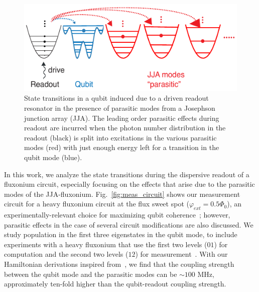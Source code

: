 \documentclass[prx,showpacs,notitlepage,twocolumn,superscriptaddress,nofootinbib,preprintnumbers,floatfix]{revtex4-2}
\begin{document}
\begin{figure}
    \centering
    \includegraphics[width=\linewidth]{Figures/Demo.pdf}
    \caption{State transitions in a qubit induced due to a driven readout resonator in the presence of parasitic modes from a Josephson junction array (JJA). The leading order parasitic effects during readout are incurred when the photon number distribution in the readout (black) is split into excitations in the various parasitic modes (red) with just enough energy left for a transition in the qubit mode (blue).}
    \label{fig:demo}
\end{figure}
In this work, we analyze the state transitions during the dispersive readout of a fluxonium circuit, especially focusing on the effects that arise due to the parasitic modes of the JJA-fluxonium. Fig.~\ref{fig:meas_circuit} shows our measurement circuit for a heavy fluxonium circuit at the flux sweet spot  ($\varphi_{ext}=0.5\Phi_0$), an experimentally-relevant choice for maximizing qubit coherence~\cite{somoroff_millisecond_2023,nguyen2019high,zhang_universal_2021,manucharyan2009fluxonium}; however, parasitic effects in the case of several circuit modifications are also discussed. We study population in the first three eigenstates in the qubit mode, to include experiments with a heavy fluxonium that use the first two levels ($01$) for computation and the second two levels ($12$) for measurement~\cite{zhang_universal_2021}. %
With our Hamiltonian derivations inspired from~\cite{viola2015collective}, we find that the coupling strength between the qubit mode and the parasitic modes can be $\sim 100$ MHz, approximately ten-fold higher than the qubit-readout coupling strength. %
\end{document}
